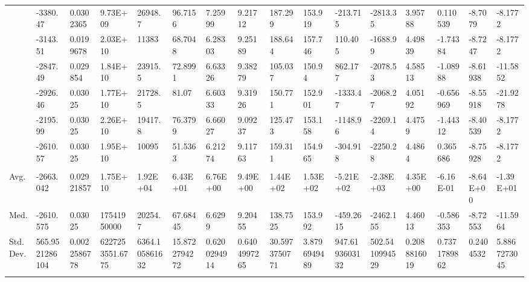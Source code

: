 \documentclass[paper=a4, fontsize=11pt]{scrartcl}
\numberwithin{equation}{section}
\numberwithin{figure}{section}
\numberwithin{table}{section}
\begin{document}
{{\begin{tabular}{l || l | l | l | l | l | l | l | l | l | l | l | l | l | l | l}
    & -3380.47 & 0.0302365 & 9.73E+09 & 26948.7 & 96.7156 & 7.25999 & 9.21712 & 187.299 & 153.919 & -213.715 & -2813.35 & 3.95788 & 0.110539 & -8.7079 & -8.1772 \\
    & -3143.51 & 0.0199678 & 2.03E+10 & 11383 & 68.7048 & 6.28303 & 9.25189 & 188.644 & 157.746 & 110.405 & -1688.99 & 4.49839 & -1.74384 & -8.7247 & -8.1772 \\
    & -2847.49 & 0.029854 & 1.84E+10 & 23915.5 & 72.8991 & 6.63326 & 9.38279 & 105.037 & 150.94 & 862.177 & -2078.53 & 4.58513 & -1.08988 & -8.61938 & -11.5852 \\
    & -2926.46 & 0.03025 & 1.77E+10 & 21728.5 & 81.07 & 6.60333 & 9.31926 & 150.771 & 152.901 & -1333.47 & -2068.27 & 4.05192 & -0.656969 & -8.55918 & -21.9278 \\
    & -2195.99 & 0.03025 & 2.26E+10 & 19417.8 & 76.3799 & 6.66027 & 9.09237 & 125.473 & 153.158 & -1148.96 & -2269.14 & 4.4759 & -1.44312 & -8.40539 & -8.1772 \\
    & -2610.57 & 0.03025 & 1.95E+10 & 10095 & 51.5363 & 6.21274 & 9.11763 & 159.311 & 154.965 & -304.918 & -2250.28 & 4.4864 & 0.365686 & -8.75928 & -8.1772 \\

    \hline \\
    Avg.      &  -2663.042 & 0.02921857 & 1.75E+10 & 1.92E+04 & 6.43E+01 & 6.76E+00 & 9.49E+00 & 1.44E+02 & 1.53E+02 & -5.21E+02 & -2.38E+03 & 4.35E+00 & -6.16E-01 & -8.64E+00 & -1.39E+01 \\
    Med.      &  -2610.575 & 0.03025 & 17541950000 & 20254.7 & 67.68445 & 6.6299 & 9.20455 & 138.7525 & 153.992 & -459.2615 & -2462.155 & 4.46013 & -0.586353 & -8.72553 & -11.5964 \\
    Std. Dev. &  565.9521286104 & 0.0022586778 & 6227253551.6775 & 6364.105861632 & 15.8722794272 & 0.6200294914 & 0.6404997265 & 30.5973750771 & 3.8796949489 & 947.6193603132 & 502.5410994529 & 0.2088816019 & 0.7371789862 & 0.2404532 & 5.8867273045 \\

	\hline \\

\end{tabular}
}
}
\end{document}
